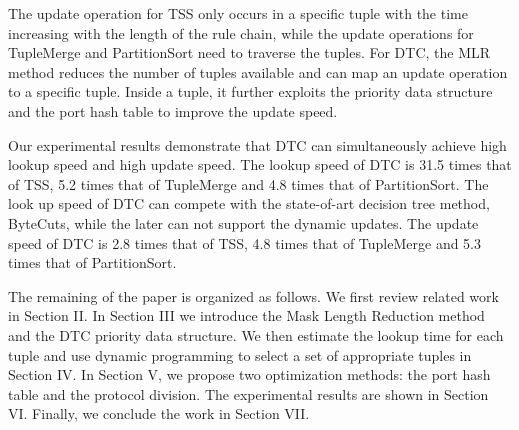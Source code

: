 The update operation for TSS only occurs in a specific tuple with the time increasing with the length of the rule chain, while the update operations for TupleMerge and PartitionSort need to traverse the tuples. For DTC, the MLR method reduces the number of tuples available and can map an update operation to a specific tuple. Inside a tuple, it further exploits the priority data structure and the port hash table to improve the update speed.

Our experimental results demonstrate that DTC can simultaneously achieve high lookup speed and high update speed. The lookup speed of DTC is 31.5 times that of TSS, 5.2 times that of TupleMerge and 4.8 times that of PartitionSort. The look up speed of DTC can compete with the  state-of-art decision tree method, ByteCuts, while the later can not support the dynamic updates.  The update speed of DTC is 2.8 times that of TSS, 4.8 times that of TupleMerge and 5.3 times that of PartitionSort.

The remaining of the paper is organized as follows. We first review related work in Section II. In Section III we introduce the Mask Length Reduction method and the DTC priority data structure. We then estimate the lookup time for each tuple and use dynamic programming to select a set of appropriate tuples in Section IV. In Section V, we propose two optimization methods: the port hash table and the protocol division. The experimental results are shown in Section VI. Finally, we conclude the work in Section VII.


